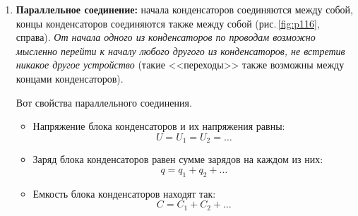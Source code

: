 \documentclass[main.tex]{subfiles}
\begin{document}
\begin{enumerate}
    Вот свойства последовательного соединения.
    \begin{itemize}
        \item Заряд блока конденсаторов\footnote{Блок конденсаторов~--- это группа соединенных между собой конденсаторов (блок имеет два вывода, или конца). Такой блок можно рассматривать как один сложный конденсатор.} и заряды конденсаторов равны:
        \begin{equation}
            q=q_1=q_2=\ldots
        \end{equation}
        \item Напряжение между концами блока конденсаторов равно сумме напряжений на каждом конденсаторе:
        \begin{equation}
            U=U_1+U_2+\ldots
        \end{equation}
        \item Емкость блока конденсаторов находят из соотношения: 
        \begin{equation}
            \dfrac{1}{C}=\dfrac{1}{C_1}+\dfrac{1}{C_2}+\ldots
        \end{equation}
    \end{itemize}
    
    
    
    \item \textbf{Параллельное соединение:} начала конденсаторов соединяются между собой, концы конденсаторов соединяются также между собой (рис.\,\ref{fig:p116}, справа). \emph{От начала одного из конденсаторов по проводам возможно мысленно перейти к началу любого другого из конденсаторов, не встретив никакое другое устройство} (такие <<переходы>> также возможны между концами конденсаторов).

    Вот свойства параллельного соединения.
    \begin{itemize}
        \item Напряжение блока конденсаторов и их напряжения равны:
        \begin{equation}
            U=U_1=U_2=\ldots
        \end{equation}
        \item Заряд блока конденсаторов равен сумме зарядов на каждом из них:
        \begin{equation}
            q=q_1+q_2+\ldots
        \end{equation}
        \item Емкость блока конденсаторов находят так: 
        \begin{equation}
            C=C_1+C_2+\ldots
        \end{equation}
    \end{itemize}
    

\end{enumerate}
\end{document}
